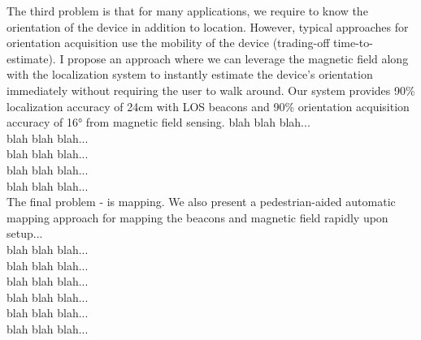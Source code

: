 \documentclass[10pt]{article}
\begin{document}
The third problem is that for many applications, we require to know the orientation of the device in addition to location. However, 
typical approaches for orientation acquisition use the mobility of the device (trading-off time-to-estimate). I propose an approach where we can leverage the magnetic field along with the localization system to 
instantly estimate the device’s orientation immediately without requiring the user to walk around. Our system provides 90\% localization accuracy of 24cm with LOS beacons and 90\% orientation acquisition accuracy of 16° from magnetic field sensing. blah blah blah...\\
blah blah blah...\\
blah blah blah...\\
blah blah blah...\\
blah blah blah...\\

The final problem - is mapping. We also present a pedestrian-aided automatic mapping approach for mapping the beacons and magnetic field rapidly upon setup... \\
blah blah blah...\\
blah blah blah...\\
blah blah blah...\\
blah blah blah...\\
blah blah blah...\\
blah blah blah...\\

\end{document}
